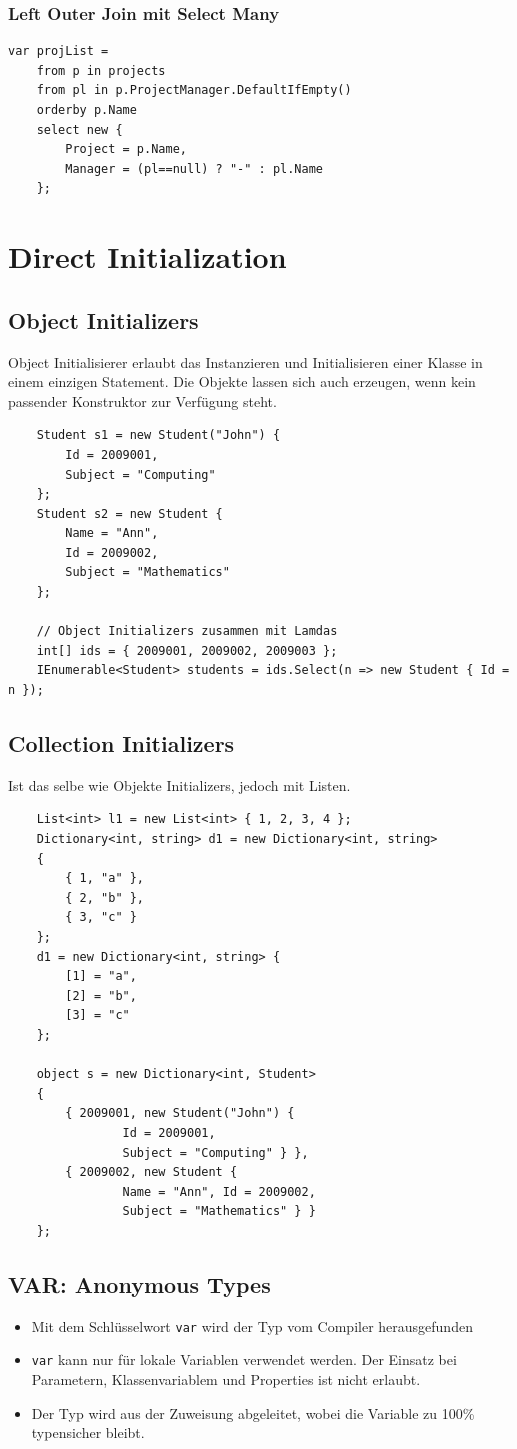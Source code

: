 \subsubsection{Left Outer Join mit Select Many}
\begin{lstlisting}
var projList = 
	from p in projects
	from pl in p.ProjectManager.DefaultIfEmpty()
	orderby p.Name
	select new { 
		Project = p.Name,
		Manager = (pl==null) ? "-" : pl.Name 
	};
\end{lstlisting}


\section{Direct Initialization}
\subsection{Object Initializers}
Object Initialisierer erlaubt das Instanzieren und Initialisieren einer Klasse in einem einzigen Statement. Die Objekte lassen sich auch erzeugen, wenn kein passender Konstruktor zur Verfügung steht.
\begin{lstlisting}
	Student s1 = new Student("John") {
		Id = 2009001,
		Subject = "Computing"
	};
	Student s2 = new Student {
		Name = "Ann",
		Id = 2009002,
		Subject = "Mathematics"
	};
	
	// Object Initializers zusammen mit Lamdas
	int[] ids = { 2009001, 2009002, 2009003 };
	IEnumerable<Student> students = ids.Select(n => new Student { Id = n });
\end{lstlisting}

\subsection{Collection Initializers}
Ist das selbe wie Objekte Initializers, jedoch mit Listen.
\begin{lstlisting}
	List<int> l1 = new List<int> { 1, 2, 3, 4 };
	Dictionary<int, string> d1 = new Dictionary<int, string>
	{
		{ 1, "a" },
		{ 2, "b" },
		{ 3, "c" }
	};
	d1 = new Dictionary<int, string> {
		[1] = "a",
		[2] = "b",
		[3] = "c"
	};
	
	object s = new Dictionary<int, Student>
	{
		{ 2009001, new Student("John") {
				Id = 2009001,
				Subject = "Computing" } },
		{ 2009002, new Student {
				Name = "Ann", Id = 2009002,
				Subject = "Mathematics" } }
	};
\end{lstlisting}

\subsection{VAR: Anonymous Types}
\begin{itemize}
	\item Mit dem Schlüsselwort \lstinline|var| wird der Typ vom Compiler herausgefunden
	\item \lstinline|var| kann nur für lokale Variablen verwendet werden. Der Einsatz bei Parametern, Klassenvariablem und Properties ist nicht erlaubt.
	\item Der Typ wird aus der Zuweisung abgeleitet, wobei die Variable zu 100\% typensicher bleibt.
\end{itemize}

